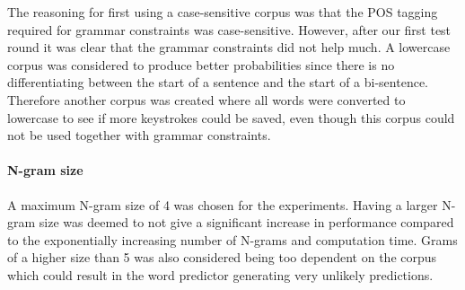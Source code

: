The reasoning for first using a case-sensitive corpus was that the POS tagging required for grammar constraints was case-sensitive. However, after our first test round it was clear that the grammar constraints did not help much. A lowercase corpus was considered to produce better probabilities since there is no differentiating between the start of a sentence and the start of a bi-sentence. Therefore another corpus was created where all words were converted to lowercase to see if more keystrokes could be saved, even though this corpus could not be used together with grammar constraints.

\paragraph{N-gram size}
A maximum N-gram size of 4 was chosen for the experiments. Having a larger N-gram size was deemed to not give a significant increase in performance compared to the exponentially increasing number of N-grams and computation time. Grams of a higher size than 5 was also considered being too dependent on the corpus which could result in the word predictor generating very unlikely predictions.